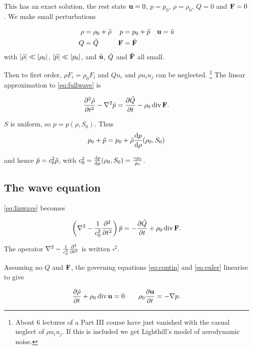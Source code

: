 \documentclass{notes}
\renewcommand{\Box}{\square}
\DeclareMathOperator{\dive}{div}
\begin{document}
This has an exact solution, the rest state $\mathbf{u} = 0$, $p=p_0$,
$\rho = \rho_0$, $Q = 0$ and $\mathbf{F} = 0$.  We make small perturbations

\begin{align*}
\rho &= \rho_0 + \Tilde{\rho} &
p &= p_0 + \Tilde{p} &
\mathbf{u} &= \Tilde{u} \\
Q &= \Tilde{Q} &
\mathbf{F} &= \Tilde{\mathbf{F}} \\
\end{align*}
with $\left|\Tilde{\rho}\right| \ll \left|\rho_0\right|$,
$\left|\Tilde{p}\right| \ll \left|p_0\right|$, and $\Tilde{\mathbf{u}}$, $\Tilde{Q}$
and $\Tilde{\mathbf{F}}$ all small.

Then to first order, $\rho F_i = \rho_0 F_i$ and
$Q u_i$ and $\rho u_i u_j$ can be neglected.%
\footnote{About 6 lectures of a Part III course have just vanished
  with the casual neglect of $\rho u_i u_j$.  If this is included we
  get Lighthill's model of aerodynamic noise.}
The linear approximation to \eqref{eq:fullwave} is

\begin{equation}\label{eq:linwave}
\pd{^2 \Tilde{\rho}}{t^2}
- \nabla^2 \Tilde{p} = \pddt{\Tilde{Q}} - \rho_0 \dive \vF.
\end{equation}

$S$ is uniform, so $p = p(\rho,S_0)$.  Thus
\[
p_0 + \Tilde{p} = p_0 + \Tilde{\rho} \frac{\mathrm{d} p}{\mathrm{d}\rho} (\rho_0,S_0)
\]

and hence $\Tilde{p} = c_0^2 \Tilde{\rho}$, with
$c_0^2 = \frac{\mathrm{d} p}{\mathrm{d}\rho} (\rho_0,S_0) = \tfrac{\gamma p_0}{\rho_0}$.

\subsection{The wave equation}

\eqref{eq:linwave} becomes

\begin{equation}\label{eq:waveqn}
\left( \nabla^2 - \frac{1}{c_0^2} \pd{^2}{t^2} \right) \Tilde{p}
= - \pddt{\Tilde{Q}} + \rho_0 \dive \vF.
\end{equation}

The operator $\nabla^2 - \frac{1}{c_0^2} \frac{\partial ^2}{\partial t^2}$ is written
$\Box^2$.

Assuming no $Q$ and $\mathbf{F}$, the governing equations \eqref{eq:contin}
and \eqref{eq:euler} linearise to give

\begin{equation}\label{eq:lingov}
\pddt{\Tilde{\rho}} + \rho_0 \dive \vu = 0 \qquad
\rho_0 \pddt{\vu} = - \nabla p.
\end{equation}
\end{document}
